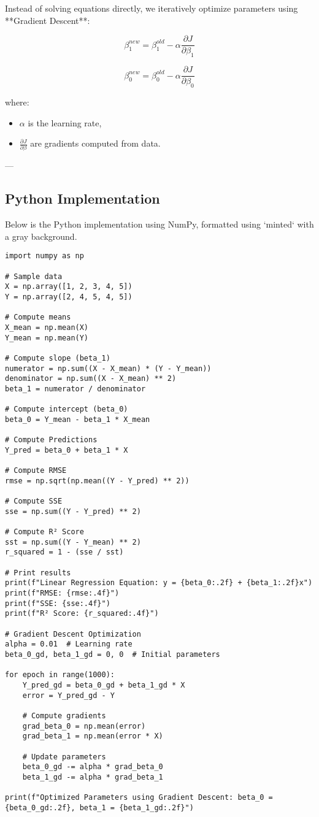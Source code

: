 Instead of solving equations directly, we iteratively optimize parameters using **Gradient Descent**:

\[
\beta_1^{new} = \beta_1^{old} - \alpha \frac{\partial J}{\partial \beta_1}
\]

\[
\beta_0^{new} = \beta_0^{old} - \alpha \frac{\partial J}{\partial \beta_0}
\]

where:
\begin{itemize}
    \item \( \alpha \) is the learning rate,
    \item \( \frac{\partial J}{\partial \beta} \) are gradients computed from data.
\end{itemize}

---

\subsection{Python Implementation}

Below is the Python implementation using NumPy, formatted using `minted` with a gray background.

\begin{verbatim}
import numpy as np

# Sample data
X = np.array([1, 2, 3, 4, 5])
Y = np.array([2, 4, 5, 4, 5])

# Compute means
X_mean = np.mean(X)
Y_mean = np.mean(Y)

# Compute slope (beta_1)
numerator = np.sum((X - X_mean) * (Y - Y_mean))
denominator = np.sum((X - X_mean) ** 2)
beta_1 = numerator / denominator

# Compute intercept (beta_0)
beta_0 = Y_mean - beta_1 * X_mean

# Compute Predictions
Y_pred = beta_0 + beta_1 * X

# Compute RMSE
rmse = np.sqrt(np.mean((Y - Y_pred) ** 2))

# Compute SSE
sse = np.sum((Y - Y_pred) ** 2)

# Compute R² Score
sst = np.sum((Y - Y_mean) ** 2)
r_squared = 1 - (sse / sst)

# Print results
print(f"Linear Regression Equation: y = {beta_0:.2f} + {beta_1:.2f}x")
print(f"RMSE: {rmse:.4f}")
print(f"SSE: {sse:.4f}")
print(f"R² Score: {r_squared:.4f}")

# Gradient Descent Optimization
alpha = 0.01  # Learning rate
beta_0_gd, beta_1_gd = 0, 0  # Initial parameters

for epoch in range(1000):
    Y_pred_gd = beta_0_gd + beta_1_gd * X
    error = Y_pred_gd - Y
    
    # Compute gradients
    grad_beta_0 = np.mean(error)
    grad_beta_1 = np.mean(error * X)
    
    # Update parameters
    beta_0_gd -= alpha * grad_beta_0
    beta_1_gd -= alpha * grad_beta_1

print(f"Optimized Parameters using Gradient Descent: beta_0 = 
{beta_0_gd:.2f}, beta_1 = {beta_1_gd:.2f}")
\end{verbatim}

